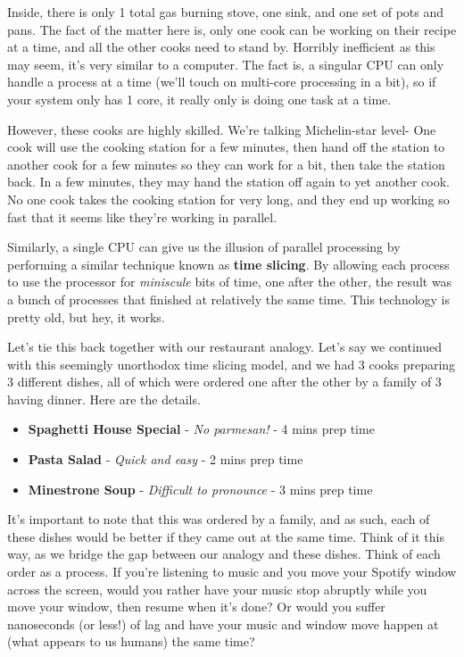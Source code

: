 \documentclass[english, 10pt]{article}
\begin{document}
Inside, there is only 1 total gas burning stove, one sink, and one set of pots and pans. The fact of the matter here is, only one cook can be working on their recipe at a time, and all the other cooks need to stand by. Horribly inefficient as this may seem, it's very similar to a computer. The fact is, a singular CPU can only handle a process at a time (we'll touch on multi-core processing in a bit), so if your system only has 1 core, it really only is doing one task at a time.\newline

However, these cooks are highly skilled. We're talking Michelin-star level- One cook will use the cooking station for a few minutes, then hand off the station to another cook for a few minutes so they can work for a bit, then take the station back. In a few minutes, they may hand the station off again to yet another cook. No one cook takes the cooking station for very long, and they end up working so fast that it seems like they're working in parallel.\newline

Similarly, a single CPU can give us the illusion of parallel processing by performing a similar technique known as \textbf{time slicing}. By allowing each process to use the processor for \textit{miniscule} bits of time, one after the other, the result was a bunch of processes that finished at relatively the same time. This technology is pretty old, but hey, it works.\newline

Let's tie this back together with our restaurant analogy. Let's say we continued with this seemingly unorthodox time slicing model, and we had 3 cooks preparing 3 different dishes, all of which were ordered one after the other by a family of 3 having dinner. Here are the details.\newline

\begin{itemize}
	\item \textbf{Spaghetti House Special} - \textit{No parmesan!} - 4 mins prep time
	\item \textbf{Pasta Salad} - \textit{Quick and easy} - 2 mins prep time
	\item \textbf{Minestrone Soup} - \textit{Difficult to pronounce} - 3 mins prep time
\end{itemize} 

It's important to note that this was ordered by a family, and as such, each of these dishes would be better if they came out at the same time. Think of it this way, as we bridge the gap between our analogy and these dishes. Think of each order as a process. If you're listening to music and you move your Spotify window across the screen, would you rather have your music stop abruptly while you move your window, then resume when it's done? Or would you suffer nanoseconds (or less!) of lag and have your music and window move happen at (what appears to us humans) the same time?\newline
\end{document}
